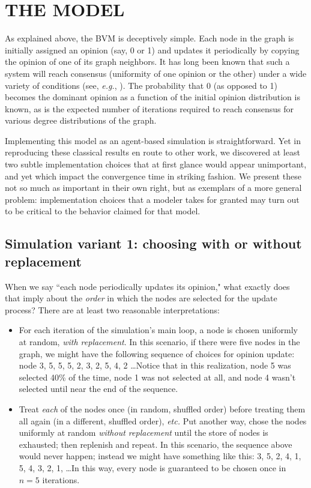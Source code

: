 
\section{THE MODEL}

As explained above, the BVM is deceptively simple. Each node in the graph is
initially assigned an opinion (say, 0 or 1) and updates it periodically by
copying the opinion of one of its graph neighbors. It has long been known that
such a system will reach consensus (uniformity of one opinion or the other)
under a wide variety of conditions (see, \textit{e.g.},
\cite{sood_voter_2005}). The probability that 0 (as opposed to 1) becomes the
dominant opinion as a function of the initial opinion distribution is known,
as is the expected number of iterations required to reach consensus for
various degree distributions of the graph.

Implementing this model as an agent-based simulation is straightforward. Yet
in reproducing these classical results en route to other work, we discovered
at least two subtle implementation choices that at first glance would appear
unimportant, and yet which impact the convergence time in striking fashion. We
present these not so much as important in their own right, but as exemplars of
a more general problem: implementation choices that a modeler takes for
granted may turn out to be critical to the behavior claimed for that model.

\subsection{Simulation variant 1: choosing with or without replacement}

When we say ``each node periodically updates its opinion," what exactly does
that imply about the \textit{order} in which the nodes are selected for the
update process? There are at least two reasonable interpretations:

\begin{itemize}
\itemsep.1em

\item For each iteration of the simulation's main loop, a node is chosen
uniformly at random, \textit{with replacement}. In this scenario, if there
were five nodes in the graph, we might have the following sequence of choices
for opinion update: node 3, 5, 5, 5, 2, 3, 2, 5, 4, 2 \dots Notice that in
this realization, node 5 was selected 40\% of the time, node 1 was
not selected at all, and node 4 wasn't selected until near the end of the
sequence.

\item Treat \textit{each} of the nodes once (in random, shuffled order) before
treating them all again (in a different, shuffled order), \textit{etc.} Put
another way, chose the nodes uniformly at random \textit{without replacement}
until the store of nodes is exhausted; then replenish and repeat. In this
scenario, the sequence above would never happen; instead we might have
something like this: 3, 5, 2, 4, 1, 5, 4, 3, 2, 1, \dots In this way, every
node is guaranteed to be chosen once in $n=5$ iterations.

\end{itemize}

